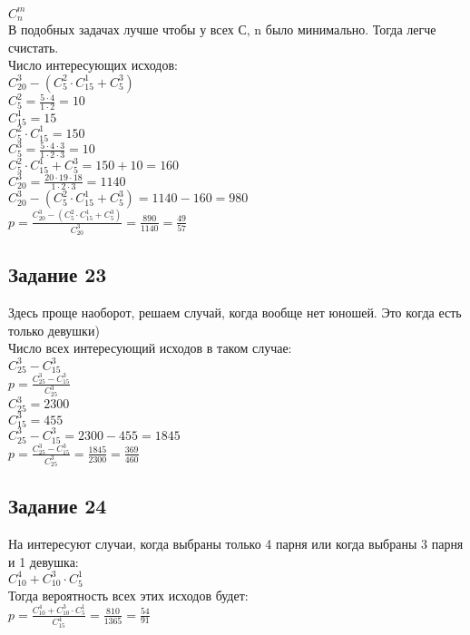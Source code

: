 \documentclass[12pt]{article}
\begin{document}
$C_n^m$\\
В подобных задачах лучше чтобы у всех С, n было минимально. Тогда легче счистать.\\
Число интересующих исходов:\\
$C_{20}^3-(C_{5}^2\cdot C_{15}^1+C_{5}^3)$\\
$C_{5}^2=\frac{5\cdot4}{1\cdot2}=10$\\
$C_{15}^1=15$\\
$C_{5}^2\cdot C_{15}^1=150$\\
$C_{5}^3=\frac{5\cdot4\cdot3}{1\cdot2\cdot3}=10$\\
$C_{5}^2\cdot C_{15}^1+C_{5}^3=150+10=160$\\
$C_{20}^3=\frac{20\cdot19\cdot18}{1\cdot2\cdot3}=1140$\\
$C_{20}^3-(C_{5}^2\cdot C_{15}^1+C_{5}^3)=1140-160=980$\\
$p=\frac{C_{20}^3-(C_{5}^2\cdot C_{15}^1+C_{5}^3)}{C_{20}^3}=\frac{890}{1140}=\frac{49}{57}$

\newpage
\subsection{Задание 23}

Здесь проще наоборот, решаем случай, когда вообще нет юношей.
Это когда есть только девушки)\\
Число всех интересующий исходов в таком случае:\\
$C_{25}^3-C_{15}^3$\\
$p=\frac{C_{25}^3-C_{15}^3}{C_{25}^3}$\\
$C_{25}^3=2300$\\
$C_{15}^3=455$\\
$C_{25}^3-C_{15}^3=2300-455=1845$\\
$p=\frac{C_{25}^3-C_{15}^3}{C_{25}^3}=\frac{1845}{2300}=\frac{369}{460}$

\newpage
\subsection{Задание 24}

На интересуют случаи, когда выбраны только 4 парня или когда выбраны 3 парня и 1 девушка:\\
$C_{10}^4+C_{10}^3\cdot C_{5}^1$\\
Тогда вероятность всех этих исходов будет:\\
$
p=\frac{C_{10}^4+C_{10}^3\cdot C_{5}^1}{C_{15}^4}
=\frac{810}{1365}=\frac{54}{91}
$
\end{document}
